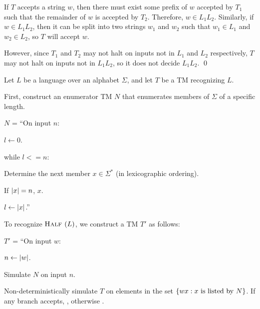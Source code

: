 \begin{problem}
\begin{enumalph}
\begin{Answer}
        \step
        If $T$ accepts a string $w$, then there must exist some prefix of $w$
        accepted by $T_1$ such that the remainder of $w$ is accepted by $T_2$.
        Therefore, $w \in L_1 L_2$.
        Similarly, if $w \in L_1 L_2$, then it can be split into two strings
        $w_1$ and $w_2$ such that $w_1 \in L_1$ and $w_2 \in L_2$,
        so $T$ will accept $w$.

        However, since $T_1$ and $T_2$ may not halt on inputs not in $L_1$
        and $L_2$ respectively, $T$ may not halt on inputs not in $L_1 L_2$,
        so it does not decide $L_1 L_2$.  \qed
    \end{Answer}

    \newpage
    \setcounter{enumi}{4}
    \item \half
    \begin{Answer}
      Let $L$ be a language over an alphabet $\Sigma$,
      and let $T$ be a TM recognizing $L$.

      \step
      First, construct an enumerator TM
      $N$ that enumerates members of $\Sigma$ of a specific length.

      \step
      $N$ = ``On input $n$:
        \begin{enumarabic}
          \item $l \gets 0$.
          \item while $l <= n$:
            \begin{enumarabic*}
              \item Determine the next member $x \in \Sigma^*$ (in lexicographic ordering).
              \item If $\lvert x\rvert = n$, \List $x$.
              \item $l \gets \lvert x\rvert$.''
            \end{enumarabic*}
        \end{enumarabic}

      \step
      To recognize $\textsc{Half }(L)$, we construct a TM $T'$ as follows:

      \step
      $T'$ = ``On input $w$:
        \begin{enumarabic}
          \item $n \gets \lvert w\rvert$.
          \item Simulate $N$ on input $n$.
          \item Non-deterministically simulate $T$ on elements in the set
            $\left\{wx : \text{$x$ is listed by $N$}\right\}$.
            If any branch accepts, \Accept, otherwise \Reject.
        \end{enumarabic}
    \end{Answer}
  \end{enumalph}
\end{problem}
